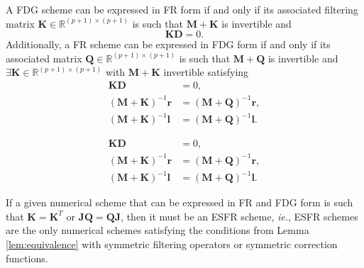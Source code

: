 \documentclass[10pt,a4paper]{amsart}
\begin{document}
\begin{lemma}
\label{lem:equivalence}
    A FDG scheme can be expressed in FR form if and only if its associated filtering matrix $\mathbf{K} \in \mathbb{R}^{(p+1) \times (p+1)}$ is such that $\mathbf{M} + \mathbf{K}$ is invertible and
    \begin{equation}
        \mathbf{K}\mathbf{D} = 0.
    \end{equation}
    Additionally, a FR scheme can be expressed in FDG form if and only if its associated matrix $\mathbf{Q} \in \mathbb{R}^{(p+1) \times (p+1)}$ is such that $\mathbf{M} + \mathbf{Q}$ is invertible and $\exists \mathbf{K} \in \mathbb{R}^{(p+1) \times (p+1)}$ with $\mathbf{M} + \mathbf{K}$ invertible satisfying
    \begin{align}
    \mathbf{K}\mathbf{D} &= 0, \\
    (\mathbf{M} + \mathbf{K})^{-1} \mathbf{r} &= (\mathbf{M} + \mathbf{Q})^{-1} \mathbf{r},\\
    (\mathbf{M} + \mathbf{K})^{-1} \mathbf{l} &= (\mathbf{M} + \mathbf{Q})^{-1} \mathbf{l}.
\end{align}
\end{lemma}

\begin{align}
    \mathbf{K}\mathbf{D} &= 0 \label{eq:equivalence1}, \\
    (\mathbf{M} + \mathbf{K})^{-1} \mathbf{r} &= (\mathbf{M} + \mathbf{Q})^{-1} \mathbf{r}, \label{eq:equivalence2}\\
    (\mathbf{M} + \mathbf{K})^{-1} \mathbf{l} &= (\mathbf{M} + \mathbf{Q})^{-1} \mathbf{l} \label{eq:equivalence3}.
\end{align}

\begin{theorem}
    If a given numerical scheme that can be expressed in FR and FDG form is such that $\mathbf{K} = \mathbf{K}^T$ or $\mathbf{J}\mathbf{Q} = \mathbf{Q}\mathbf{J}$, then it must be an ESFR scheme, \textit{ie.}, ESFR schemes are the only numerical schemes satisfying the conditions from Lemma \ref{lem:equivalence} with symmetric filtering operators or symmetric correction functions.
\end{theorem}
\end{document}
